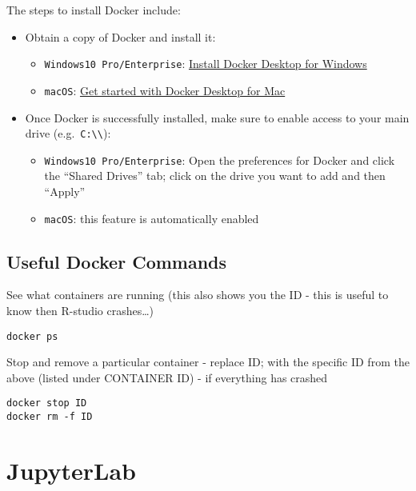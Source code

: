 \documentclass[
]{book}
\providecommand{\tightlist}{%
  \setlength{\itemsep}{0pt}\setlength{\parskip}{0pt}}
\begin{document}
The steps to install Docker include:

\begin{itemize}
\tightlist
\item
  Obtain a copy of Docker and install it:

  \begin{itemize}
  \tightlist
  \item
    \texttt{Windows10\ Pro/Enterprise}: \href{https://docs.docker.com/docker-for-windows/install/}{Install Docker Desktop for Windows}
  \item
    \texttt{macOS}: \href{https://docs.docker.com/docker-for-mac/}{Get started with Docker Desktop for Mac}
  \end{itemize}
\item
  Once Docker is successfully installed, make sure to enable access to your main drive (e.g.~\texttt{C:\textbackslash{}\textbackslash{}}):

  \begin{itemize}
  \tightlist
  \item
    \texttt{Windows10\ Pro/Enterprise}: Open the preferences for Docker and click the
    ``Shared Drives'' tab; click on the drive you want to add and then ``Apply''
  \item
    \texttt{macOS}: this feature is automatically enabled
  \end{itemize}
\end{itemize}

\hypertarget{useful-docker-commands}{%
\section{Useful Docker Commands}\label{useful-docker-commands}}

See what containers are running (this also shows you the ID - this is useful to know then R-studio crashes\ldots)

\begin{verbatim}
docker ps
\end{verbatim}

Stop and remove a particular container - replace ID; with the specific ID from the above (listed under CONTAINER ID) - if everything has crashed

\begin{verbatim}
docker stop ID
docker rm -f ID
\end{verbatim}

\hypertarget{jupyterlab}{%
\chapter{JupyterLab}\label{jupyterlab}}
\end{document}
